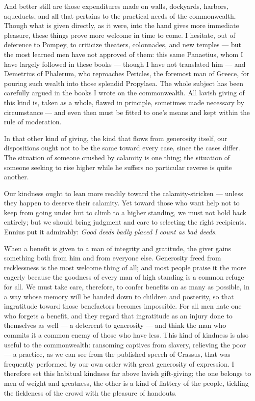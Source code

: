 And better still are those expenditures made on walls, dockyards, harbors, aqueducts, and all that pertains to the practical needs of the commonwealth. Though what is given directly, as it were, into the hand gives more immediate pleasure, these things prove more welcome in time to come. I hesitate, out of deference to Pompey, to criticize theaters, colonnades, and new temples — but the most learned men have not approved of them: this same Panaetius, whom I have largely followed in these books — though I have not translated him — and Demetrius of Phalerum, who reproaches Pericles, the foremost man of Greece, for pouring such wealth into those splendid Propylaea. The whole subject has been carefully argued in the books I wrote on the commonwealth. All lavish giving of this kind is, taken as a whole, flawed in principle, sometimes made necessary by circumstance — and even then must be fitted to one's means and kept within the rule of moderation.


 In that other kind of giving, the kind that flows from generosity itself, our dispositions ought not to be the same toward every case, since the cases differ. The situation of someone crushed by calamity is one thing; the situation of someone seeking to rise higher while he suffers no particular reverse is quite another.

 Our kindness ought to lean more readily toward the calamity-stricken — unless they happen to deserve their calamity. Yet toward those who want help not to keep from going under but to climb to a higher standing, we must not hold back entirely; but we should bring judgment and care to selecting the right recipients. Ennius put it admirably: \textit{Good deeds badly placed I count as bad deeds.}

 When a benefit is given to a man of integrity and gratitude, the giver gains something both from him and from everyone else. Generosity freed from recklessness is the most welcome thing of all; and most people praise it the more eagerly because the goodness of every man of high standing is a common refuge for all. We must take care, therefore, to confer benefits on as many as possible, in a way whose memory will be handed down to children and posterity, so that ingratitude toward those benefactors becomes impossible. For all men hate one who forgets a benefit, and they regard that ingratitude as an injury done to themselves as well — a deterrent to generosity — and think the man who commits it a common enemy of those who have less. This kind of kindness is also useful to the commonwealth: ransoming captives from slavery, relieving the poor — a practice, as we can see from the published speech of Crassus, that was frequently performed by our own order with great generosity of expression. I therefore set this habitual kindness far above lavish gift-giving; the one belongs to men of weight and greatness, the other is a kind of flattery of the people, tickling the fickleness of the crowd with the pleasure of handouts.

